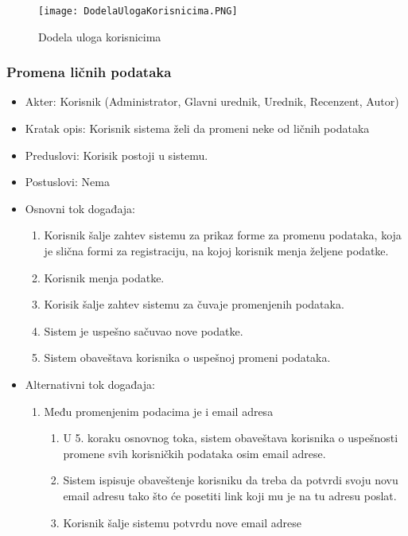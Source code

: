 \documentclass[a4paper]{article}
\begin{document}
\begin{figure}[hbt!]
    \centering
    \texttt{[image: DodelaUlogaKorisnicima.PNG]}
    \caption{Dodela uloga korisnicima}
    \label{fig:my_label}
\end{figure}



\subsubsection{Promena ličnih podataka}
\begin{itemize}
    \item Akter: Korisnik (Administrator, Glavni urednik, Urednik, Recenzent, Autor)
    \item Kratak opis: Korisnik sistema želi da promeni neke od ličnih podataka
    \item Preduslovi: Korisik postoji u sistemu.
    \item Postuslovi: Nema
    \item Osnovni tok događaja:
        \begin{enumerate}
            \item Korisnik šalje zahtev sistemu za prikaz forme za promenu podataka, koja je slična formi za registraciju, na kojoj korisnik menja željene podatke.
            \item Korisnik menja podatke.
            \item Korisik šalje zahtev sistemu za čuvaje promenjenih podataka.
            \item Sistem je uspešno sačuvao nove podatke.
            \item Sistem obaveštava korisnika o uspešnoj promeni podataka.
        \end{enumerate}
    \item Alternativni tok događaja:
        \begin{enumerate}
            \item Među promenjenim podacima je i email adresa
                \begin{enumerate}
                    \item U 5. koraku osnovnog toka, sistem obaveštava korisnika o uspešnosti promene svih korisničkih podataka osim email adrese.
                    \item Sistem ispisuje obaveštenje korisniku da treba da potvrdi svoju novu email adresu tako što će posetiti link koji mu je na tu adresu poslat.
                    \item Korisnik šalje sistemu potvrdu nove email adrese

\end{enumerate}
\end{enumerate}
\end{itemize}
\end{document}
